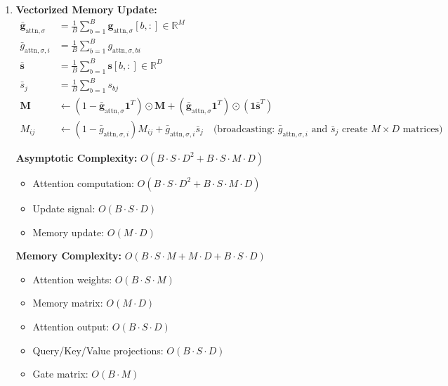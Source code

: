 \documentclass{article}
\begin{document}
\begin{enumerate}
The attention-based gates determine update strengths by averaging the attention weights across sequence positions. This creates a more sophisticated gating mechanism where the update strength for each memory slot is directly related to how much attention the current input paid to that slot. Memory slots that received more attention will be updated more strongly, creating a contextually appropriate update pattern.

\item \textbf{Vectorized Memory Update:}
\begin{align}
\bar{\mathbf{g}}_{\text{attn},\sigma} &= \frac{1}{B}\sum_{b=1}^{B} \mathbf{g}_{\text{attn},\sigma}[b, :] \in \mathbb{R}^{M} \\
\bar{g}_{\text{attn},\sigma,i} &= \frac{1}{B}\sum_{b=1}^{B} g_{\text{attn},\sigma,bi} \\
\bar{\mathbf{s}} &= \frac{1}{B}\sum_{b=1}^{B} \mathbf{s}[b, :] \in \mathbb{R}^{D} \\
\bar{s}_j &= \frac{1}{B}\sum_{b=1}^{B} s_{bj} \\
\mathbf{M} &\leftarrow (1 - \bar{\mathbf{g}}_{\text{attn},\sigma} \mathbf{1}^T) \odot \mathbf{M} + (\bar{\mathbf{g}}_{\text{attn},\sigma} \mathbf{1}^T) \odot (\mathbf{1} \bar{\mathbf{s}}^T) \\
M_{ij} &\leftarrow (1 - \bar{g}_{\text{attn},\sigma,i}) M_{ij} + \bar{g}_{\text{attn},\sigma,i} \bar{s}_j \quad \text{(broadcasting: $\bar{g}_{\text{attn},\sigma,i}$ and $\bar{s}_j$ create $M \times D$ matrices)}
\end{align}

\textbf{Asymptotic Complexity:} $O(B \cdot S \cdot D^2 + B \cdot S \cdot M \cdot D)$
\begin{itemize}
\item Attention computation: $O(B \cdot S \cdot D^2 + B \cdot S \cdot M \cdot D)$
\item Update signal: $O(B \cdot S \cdot D)$
\item Memory update: $O(M \cdot D)$
\end{itemize}

\textbf{Memory Complexity:} $O(B \cdot S \cdot M + M \cdot D + B \cdot S \cdot D)$
\begin{itemize}
\item Attention weights: $O(B \cdot S \cdot M)$
\item Memory matrix: $O(M \cdot D)$
\item Attention output: $O(B \cdot S \cdot D)$
\item Query/Key/Value projections: $O(B \cdot S \cdot D)$
\item Gate matrix: $O(B \cdot M)$
\end{itemize}
\end{enumerate}
\end{document}

